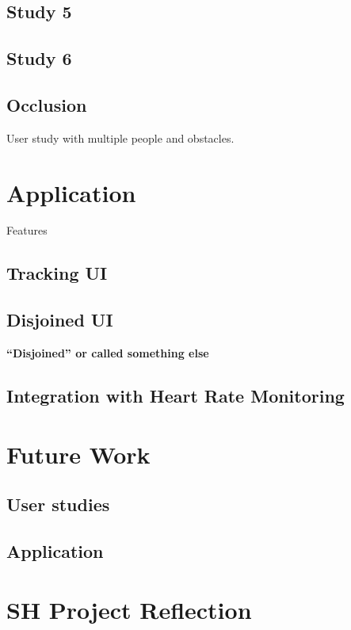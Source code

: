\documentclass{sigchi}
\begin{document}
\subsection{Study 5}

\subsection{Study 6}

\subsection{Occlusion}

User study with multiple people and obstacles.

\section{Application}

Features

\subsection{Tracking UI}

\subsection{Disjoined UI}

\textbf{``Disjoined'' or called something else}

\subsection{Integration with Heart Rate Monitoring}

\section{Future Work}

\subsection{User studies}

\subsection{Application}

\section{SH Project Reflection}
\end{document}
